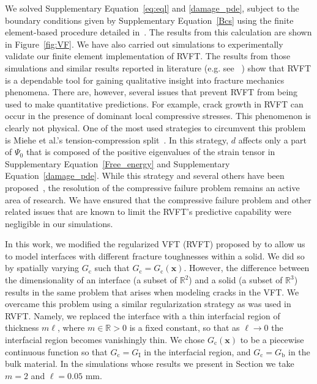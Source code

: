 \documentclass[12pt,onecolumn]{article}
\makeatletter
\DeclareRobustCommand*{\nameref}[1]{%
      \emph{\myorg@nameref{#1}}%
    }%
\newcommand{\bs}[1]{\ensuremath{\mathbf{#1}}}
\makeatother
\begin{document}
\begin{bibunit}
We solved Supplementary Equation~\eqref{eq:eql} and \eqref{damage_pde}, subject to the boundary conditions given by Supplementary Equation~\eqref{Bcs} using the finite element-based procedure detailed in~\cite{miehe_2010}. The results from this calculation  are shown in Figure~\ref{fig:VF}. We have also carried out simulations to experimentally validate our finite element implementation of RVFT. The results from those simulations and similar results reported in literature (e.g. see ~\cite{mesgarnejad2015validation,miehe2010phase,wu2017phase}) show that  RVFT is a dependable tool for gaining qualitative insight into fracture mechanics phenomena. There are, however, several issues that prevent RVFT from being used to make quantitative predictions. For example, crack growth in RVFT can occur in the presence of dominant local compressive stresses. This phenomenon is clearly not physical. One of the most used strategies to circumvent this problem is Miehe et al.'s  tension-compression split~\cite{miehe2010phase}. In this strategy, $d$ affects only a part of $\Psi_0$ that is composed of the positive eigenvalues of the strain tensor in Supplementary Equation~\eqref{Free_energy} and Supplementary Equation~\eqref{damage_pde}. While this strategy and several others have been proposed~\cite{amor2009regularized,li2016gradient,strobl2016constitutive}, the resolution of the compressive failure problem remains an active area of research. We have ensured that the compressive failure problem and other related issues that are known to limit the RVFT's predictive capability were negligible in our simulations.

In this work, we modified the regularized VFT (RVFT) proposed by \cite{bourdin2000numerical} to allow us to model interfaces with different fracture toughnesses within a solid. We did so by spatially varying $G_\mathrm{c}$ such that $G_\mathrm{c} = G_\mathrm{c}(\bs{x})$. However, the difference between the dimensionality of an interface (a subset of $\mathbb{R}^2$) and a solid (a subset of $\mathbb{R}^3$) results in the same problem that arises when modeling cracks in the VFT. We overcame this problem using a similar regularization strategy as was used in RVFT. Namely, we replaced the interface with a thin interfacial region of thickness $m \ell$, where $m\in\mathbb{R}>0$ is a fixed constant, so that as $\ell \to 0$ the interfacial region becomes vanishingly thin. We chose $G_\mathrm{c}(\bs{x})$ to be a piecewise continuous function so that $G_\mathrm{c} = G_\mathrm{I}$ in the interfacial region, and $G_\mathrm{c} = G_\mathrm{b}$ in the bulk material.  In the simulations whose results we present in Section \nameref{sec:discussion} we take $m=2$ and $\ell=0.05$ mm.


\end{bibunit}
\end{document}
